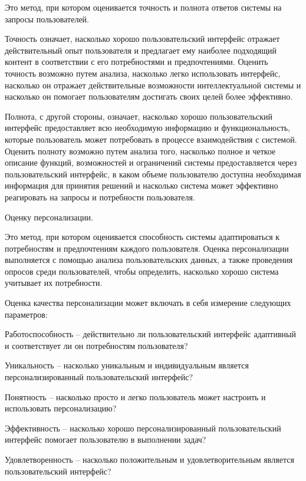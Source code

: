 {\begin{textitemize}
	Это метод, при котором оценивается точность и полнота ответов системы на запросы пользователей.
	
	Точность означает, насколько хорошо пользовательский интерфейс отражает действительный опыт пользователя и предлагает ему наиболее подходящий контент в соответствии с его потребностями и предпочтениями. Оценить точность возможно путем анализа, насколько легко использовать интерфейс, насколько он отражает действительные возможности интеллектуальной системы и насколько он помогает пользователям достигать своих целей более эффективно.
	
	Полнота, с другой стороны, означает, насколько хорошо пользовательский интерфейс предоставляет всю необходимую информацию и функциональность, которые пользователь может потребовать в процессе взаимодействия с системой. Оценить полноту возможно путем анализа того, насколько полное и четкое описание функций, возможностей и ограничений системы предоставляется через пользовательский интерфейс, в каком объеме пользователю доступна необходимая информация для принятия решений и насколько система может эффективно реагировать на запросы и потребности пользователя.
	
	\item Оценку персонализации. 
	
	Это метод, при котором оценивается способность системы адаптироваться к потребностям и предпочтениям каждого пользователя. Оценка персонализации выполняется с помощью анализа пользовательских данных, а также проведения опросов среди пользователей, чтобы определить, насколько хорошо система учитывает их потребности.
	
	Оценка качества персонализации может включать в себя измерение следующих параметров:
	\begin{textitemize}
	\item Работоспособность -- действительно ли пользовательский интерфейс адаптивный и соответствует ли он потребностям пользователя?
	\item Уникальность -- насколько уникальным и индивидуальным является персонализированный пользовательский интерфейс?
	\item Понятность -- насколько просто и легко пользователь может настроить и использовать персонализацию?
	\item Эффективность -- насколько хорошо персонализированный пользовательский интерфейс помогает пользователю в выполнении задач?
	\item Удовлетворенность -- насколько положительным и удовлетворительным является пользовательский интерфейс?
	\end{textitemize}


\end{textitemize}}
